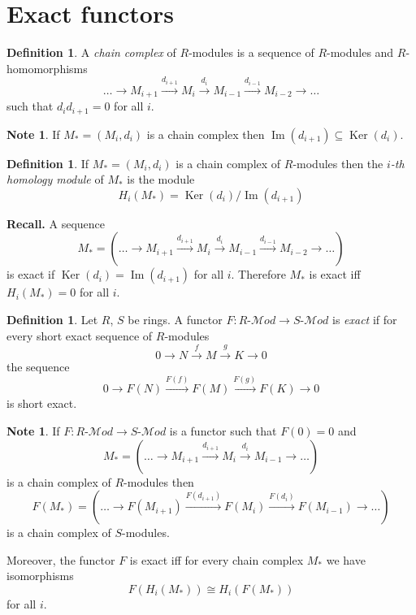 \documentclass[12pt, letterpaper, oneside]{article}
\theoremstyle{plain}
\theoremstyle{definition}
\newtheorem{definition}[theorem]{Definition}
\newtheorem{note}[theorem]{Note}
\newcommand{\lra}{\longrightarrow}
\renewcommand{\Im}{\operatorname{Im}}
\newcommand{\Ker}{\operatorname{Ker}}
\newcommand{\Mod}{{\mathcal Mod}}
\newcommand{\vs}{\vskip 5mm}
\begin{document}


\newpage
\section{Exact functors}
\label{SEC_EXACTFUNCTORS}


\begin{definition}
A \emph{chain complex} of $R$-modules is a sequence of $R$-modules and 
$R$-homomorphisms 
$${\dots} \lra M_{i+1} \overset{d_{i+1}}{\lra}  M_{i} \overset{d_{i}}{\lra} M_{i-1}  
\overset{d_{i-1}}{\lra} M_{i-2} \lra {\dots}$$
such that $d_{i}d_{i+1} = 0$ for all $i$. 
\end{definition}


\vs\vs

\begin{note}
If $M_{\ast} = (M_{i}, d_{i})$ is a chain complex then $\Im (d_{i+1}) \subseteq \Ker(d_{i})$.
\end{note}


\vs\vs

\begin{definition}
If $M_{\ast} = (M_{i}, d_{i})$ is a chain complex of $R$-modules then the \emph{$i$-th homology module}
of $M_{\ast}$ is the module
$$H_{i}(M_{\ast}) = \Ker(d_{i})/\Im(d_{i+1})$$
\end{definition}


\vs\vs


\textbf{Recall.} A sequence
$$M_{\ast} = ({\dots} \lra M_{i+1} \overset{d_{i+1}}{\lra}  M_{i} \overset{d_{i}}{\lra} M_{i-1}  
\overset{d_{i-1}}{\lra} M_{i-2} \lra {\dots})$$
is exact if $\Ker(d_{i}) = \Im(d_{i+1})$ for all $i$. Therefore $M_{\ast}$ is exact iff
$H_{i}(M_{\ast}) = 0$ for all $i$.


\vs\vs

\begin{definition}
Let $R$, $S$ be rings. A functor $F\colon \text{$R$-$\Mod$} \to \text{$S$-$\Mod$}$ is 
\emph{exact} if for every short exact sequence of $R$-modules
$$ 0 \lra N \overset{f}{\lra} M \overset{g}{\lra} K \lra 0$$
the sequence 
$$ 0 \lra F(N) \overset{F(f)}{\lra} F(M) \overset{F(g)}{\lra} F(K) \lra 0$$
is short exact. 
\end{definition}

\vs\vs

\begin{note} 
\label{NOTE_EXACTFUNCTANDHOMOLOGY}
If $F\colon \text{$R$-$\Mod$} \to \text{$S$-$\Mod$}$ 
is a functor such that $F(0) = 0$ and 
$$M_{\ast} = ({\dots} \lra M_{i+1} \overset{d_{i+1}}{\lra}  M_{i} \overset{d_{i}}{\lra} M_{i-1}  
 \lra {\dots})$$  
is a chain complex of $R$-modules then 
$$F(M_{\ast}) = ({\dots} \lra F(M_{i+1}) \overset{F(d_{i+1})}{\lra}  F(M_{i}) \overset{F(d_{i})}{\lra} F(M_{i-1})  
 \lra {\dots})$$  
is a chain complex of $S$-modules. 

Moreover, the functor $F$ is exact iff for every chain complex $M_{\ast}$
we have isomorphisms 
$$F(H_{i}(M_{\ast})) \cong H_{i}(F(M_{\ast}))$$ 
for all $i$. 
\end{note}
\end{document}
